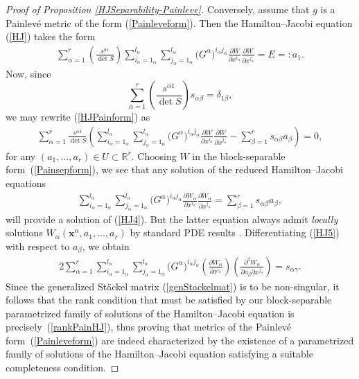 \documentclass[pdftex]{sigma}
\numberwithin{equation}{section}
\newcommand{\ialpha}{i_{\alpha}}
\newcommand{\jalpha}{j_{\alpha}}
\newcommand{\lalpha}{l_{\alpha}}
\begin{document}
\begin{proof}[Proof of Proposition \ref{HJSeparability-Painleve}]
Conversely, assume that $g$ is a Painlev\'e metric of the form (\ref{Painleveform}). Then the Hamilton--Jacobi equation (\ref{HJ}) takes the form
\begin{gather}\label{HJPainform}
\sum_{\alpha =1}^{r} \left(\frac{s^{\alpha 1}}{\det S}\right) \sum_{\ialpha =1_{\alpha}}^{\lalpha}\sum_{\jalpha =1_{\alpha}}^{\lalpha} \big(G^{\alpha}\big)^{\ialpha \jalpha}\frac{\partial W}{\partial x^{\ialpha} }\frac{\partial W}{\partial x^{\jalpha}}=E=:a_{1}.
\end{gather}
Now, since
\[
\sum_{\alpha =1}^{r}\left(\frac{s^{\alpha 1}}{\det S}\right)s_{\alpha \beta}=\delta_{1 \beta},
\]
we may rewrite (\ref{HJPainform}) as
\begin{gather} \label{HJ4}
\sum_{\alpha =1}^{r}\frac{s^{\alpha 1}}{\det S}\left(\sum_{\ialpha =1_{\alpha}}^{\lalpha}\sum_{\jalpha =1_{\alpha}}^{\lalpha}\big(G^{\alpha}\big)^{\ialpha \jalpha}\frac{\partial W}{\partial x^{\ialpha} }\frac{\partial W}{\partial x^{\jalpha}}-\sum_{\beta=1}^{r}s_{\alpha \beta}a_{\beta}\right)=0,
\end{gather}
for any $(a_1,\dots,a_r) \in U \subset \mathbb{R}^r$. Choosing $W$ in the block-separable form~(\ref{Painsepform}), we see that any solution of the reduced Hamilton--Jacobi equations
\begin{gather} \label{HJ5}
\sum_{\ialpha =1_{\alpha}}^{\lalpha}\sum_{\jalpha =1_{\alpha}}^{\lalpha}\big(G^{\alpha}\big)^{\ialpha \jalpha}\frac{\partial W_{\alpha}}{\partial x^{\ialpha} }\frac{\partial W_{\alpha}}{\partial x^{\jalpha}}=\sum_{\beta = 1}^{r}s_{\alpha \beta}a_{\beta},
\end{gather}
will provide a solution of (\ref{HJ4}). But the latter equation always admit \emph{locally} solutions $W_\alpha(\textbf{x}^\alpha, \allowbreak a_1,\dots,a_r)$ by standard PDE results \cite{Tay2011a}. Differentiating (\ref{HJ5}) with respect to $a_{\beta}$, we obtain
\begin{gather*} %
2\sum_{\alpha =1}^{r}\sum_{\ialpha =1_{\alpha}}^{\lalpha}\sum_{\jalpha =1_{\alpha}}^{\lalpha}\big(G^{\alpha}\big)^{\ialpha \jalpha}\left(\frac{\partial W_{\alpha}}{\partial x^{\ialpha}}\right)\left( \frac{\partial^{2}W_{\alpha}}{\partial a_{\beta}\partial x^{\jalpha}}\right)=s_{\alpha \gamma}.
\end{gather*}
Since the generalized St\"ackel matrix (\ref{genStackelmat}) is to be non-singular, it follows that the rank condition that must be satisfied by our block-separable parametrized family of solutions of the Hamilton--Jacobi equation is precisely~(\ref{rankPainHJ}), thus proving that metrics of the Painlev\'e form~(\ref{Painleveform}) are indeed characterized by the existence of a parametrized family of solutions of the Hamilton--Jacobi equation satisfying a suitable completeness condition.
\end{proof}
\end{document}
